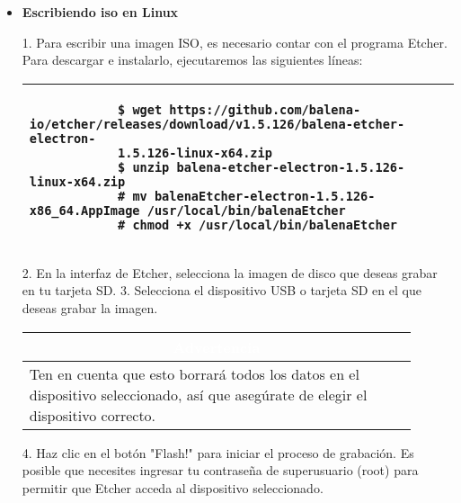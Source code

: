 \documentclass[report,12pt]{article}
\begin{document}
	\begin{itemize}[label=$\bullet$, itemsep=0pt]
	\item \textbf{Escribiendo iso en Linux} \par
	1. Para escribir una imagen ISO, es necesario contar con el programa Etcher. Para descargar e instalarlo, ejecutaremos las siguientes líneas:
	
	\vspace{.5cm}
	
	

\begin{table}[h]
	\centering
	\footnotesize %
	\color{gray} %
	\begin{tabular}{|p{\linewidth}|}
		\hline
		\begin{verbatim}
			$ wget https://github.com/balena-io/etcher/releases/download/v1.5.126/balena-etcher-electron-
			1.5.126-linux-x64.zip
			$ unzip balena-etcher-electron-1.5.126-linux-x64.zip
			# mv balenaEtcher-electron-1.5.126-x86_64.AppImage /usr/local/bin/balenaEtcher
			# chmod +x /usr/local/bin/balenaEtcher
		\end{verbatim}
		\\
		\hline
	\end{tabular}
\end{table}
	
	2. En la interfaz de Etcher, selecciona la imagen de disco que deseas grabar en tu tarjeta SD.
	3. Selecciona el dispositivo USB o tarjeta SD en el que deseas grabar la imagen. 
	
		\begin{center}
		\renewcommand{\arraystretch}{1.5}
		\setlength{\arrayrulewidth}{1pt}
		\begin{tabular}{|p{0.9\linewidth}|}
			\hline
			\multicolumn{1}{|c|}{\cellcolor{red}\textcolor{white}{\textbf{Advertencia}}} \\
			\hline
			Ten en cuenta que esto borrará todos los datos en el dispositivo seleccionado, así que asegúrate de elegir el dispositivo correcto. \\
			\hline
		\end{tabular}
	\end{center}
	
	4. Haz clic en el botón "Flash!" para iniciar el proceso de grabación. Es posible que necesites ingresar tu contraseña de superusuario (root) para permitir que Etcher acceda al dispositivo seleccionado.


\end{itemize}
\end{document}
